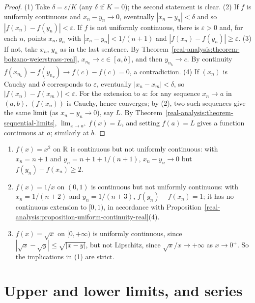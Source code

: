\begin{proof}
(1) Take $\delta = \varepsilon/K$ (any $\delta$ if $K = 0$); the second statement is clear. (2) If $f$ is uniformly continuous and $x_n - y_n \to 0$, eventually $|x_n - y_n| < \delta$ and so $|f(x_n) - f(y_n)| < \varepsilon$.
If $f$ is not uniformly continuous, there is $\varepsilon > 0$ and, for each $n$, points $x_n, y_n$ with $|x_n - y_n| < 1/(n + 1)$ and $|f(x_n) - f(y_n)| \geq \varepsilon$. (3) If not, take $x_n$, $y_n$ as in the last
sentence. By Theorem~\ref{real-analysis:theorem-bolzano-weierstrass-real}, $x_{n_k} \to c \in [a, b]$, and then $y_{n_k} \to c$. By continuity $f(x_{n_k}) - f(y_{n_k}) \to f(c) - f(c) = 0$, a contradiction. (4) If
$(x_n)$ is Cauchy and $\delta$ corresponds to $\varepsilon$, eventually $|x_n - x_m| < \delta$, so $|f(x_n) - f(x_m)| < \varepsilon$. For the extension to $a$: for any sequence $x_n \to a$ in $(a, b)$, $(f(x_n))$ is Cauchy,
hence converges; by (2), two such sequences give the same limit (as $x_n - y_n \to 0$), say $L$. By Theorem~\ref{real-analysis:theorem-sequential-limits}, $\lim_{x \to a^+}f(x) = L$, and setting $f(a) = L$ gives a function
continuous at $a$; similarly at $b$.
\end{proof}

\begin{counterexample}\label{real-analysis:counterexample-uniform-continuity}
\begin{enumerate}
\item $f(x) = x^2$ on $\mathbb{R}$ is continuous but not uniformly continuous: with $x_n = n + 1$ and $y_n = n + 1 + 1/(n+1)$, $x_n - y_n \to 0$ but $f(y_n) - f(x_n) \geq 2$.
\item $f(x) = 1/x$ on $(0, 1)$ is continuous but not uniformly continuous: with $x_n = 1/(n + 2)$ and $y_n = 1/(n + 3)$, $f(y_n) - f(x_n) = 1$; it has no continuous extension to $[0, 1)$, in accordance with
Proposition~\ref{real-analysis:proposition-uniform-continuity-real}(4).
\item $f(x) = \sqrt x$ on $[0, +\infty)$ is uniformly continuous, since $|\sqrt x - \sqrt y| \leq \sqrt{|x - y|}$, but not Lipschitz, since $\sqrt x/x \to +\infty$ as $x \to 0^+$. So the implications in (1) are strict.
\end{enumerate}
\end{counterexample}

\section{Upper and lower limits, and series}\label{real-analysis:section-series}

